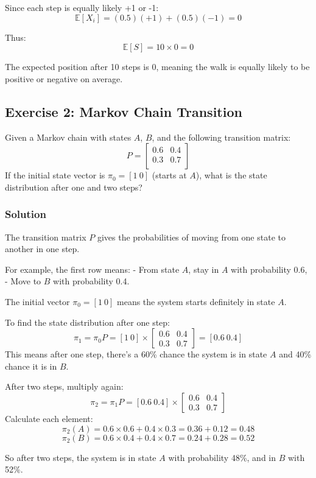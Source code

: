 \documentclass{book}
\begin{document}
Since each step is equally likely +1 or -1:
\[
\mathbb{E}[X_i] = (0.5)(+1) + (0.5)(-1) = 0
\]

Thus:
\[
\mathbb{E}[S] = 10 \times 0 = 0
\]

The expected position after 10 steps is 0, meaning the walk is equally likely to be positive or negative on average.

\subsection*{Exercise 2: Markov Chain Transition}
Given a Markov chain with states $A$, $B$, and the following transition matrix:
\[
P = \begin{bmatrix}
0.6 & 0.4 \\
0.3 & 0.7 \\
\end{bmatrix}
\]
If the initial state vector is $\pi_0 = [1\ 0]$ (starts at $A$), what is the state distribution after one and two steps?

\subsubsection*{Solution}
The transition matrix $P$ gives the probabilities of moving from one state to another in one step.

For example, the first row means:
- From state $A$, stay in $A$ with probability 0.6,
- Move to $B$ with probability 0.4.

The initial vector $\pi_0 = [1\ 0]$ means the system starts definitely in state $A$.

To find the state distribution after one step:
\[
\pi_1 = \pi_0 P = [1\ 0] \times \begin{bmatrix}0.6 & 0.4 \\ 0.3 & 0.7\end{bmatrix} = [0.6\ 0.4]
\]
This means after one step, there's a 60\% chance the system is in state $A$ and 40\% chance it is in $B$.

After two steps, multiply again:
\[
\pi_2 = \pi_1 P = [0.6\ 0.4] \times \begin{bmatrix}0.6 & 0.4 \\ 0.3 & 0.7\end{bmatrix}
\]
Calculate each element:
\[
\pi_2(A) = 0.6 \times 0.6 + 0.4 \times 0.3 = 0.36 + 0.12 = 0.48
\]
\[
\pi_2(B) = 0.6 \times 0.4 + 0.4 \times 0.7 = 0.24 + 0.28 = 0.52
\]

So after two steps, the system is in state $A$ with probability 48\%, and in $B$ with 52\%.
\end{document}
